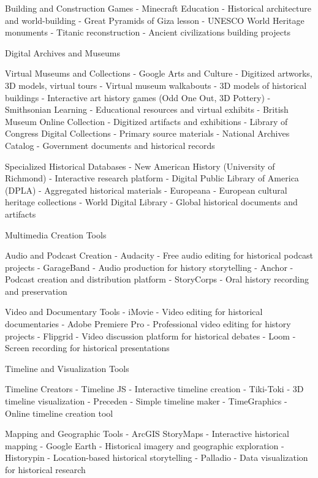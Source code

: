\begin{appendices}
  Building and Construction Games
-  Minecraft Education  - Historical architecture and world-building
  - Great Pyramids of Giza lesson
  - UNESCO World Heritage monuments
  - Titanic reconstruction
  - Ancient civilizations building projects

  Digital Archives and Museums

  Virtual Museums and Collections
-  Google Arts and Culture  - Digitized artworks, 3D models, virtual tours
  - Virtual museum walkabouts
  - 3D models of historical buildings
  - Interactive art history games (Odd One Out, 3D Pottery)
-  Smithsonian Learning  - Educational resources and virtual exhibits
-  British Museum Online Collection  - Digitized artifacts and exhibitions
-  Library of Congress Digital Collections  - Primary source materials
-  National Archives Catalog  - Government documents and historical records

  Specialized Historical Databases
-  New American History  (University of Richmond) - Interactive research platform
-  Digital Public Library of America (DPLA)  - Aggregated historical materials
-  Europeana  - European cultural heritage collections
-  World Digital Library  - Global historical documents and artifacts

  Multimedia Creation Tools

  Audio and Podcast Creation
-  Audacity  - Free audio editing for historical podcast projects
-  GarageBand  - Audio production for history storytelling
-  Anchor  - Podcast creation and distribution platform
-  StoryCorps  - Oral history recording and preservation

  Video and Documentary Tools
-  iMovie  - Video editing for historical documentaries
-  Adobe Premiere Pro  - Professional video editing for history projects
-  Flipgrid  - Video discussion platform for historical debates
-  Loom  - Screen recording for historical presentations

  Timeline and Visualization Tools

  Timeline Creators
-  Timeline JS  - Interactive timeline creation
-  Tiki-Toki  - 3D timeline visualization
-  Preceden  - Simple timeline maker
-  TimeGraphics  - Online timeline creation tool

  Mapping and Geographic Tools
-  ArcGIS StoryMaps  - Interactive historical mapping
-  Google Earth  - Historical imagery and geographic exploration
-  Historypin  - Location-based historical storytelling
-  Palladio  - Data visualization for historical research


\end{appendices}
